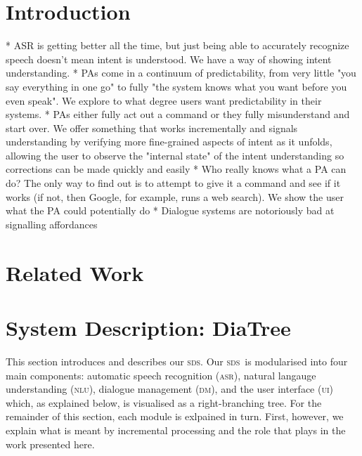 \documentclass[11pt]{article}
\title{}
\author{Casey Kennington \and David Schlangen}
\newcommand{\sds}[0]{\textsc{sds}}
\newcommand{\nlu}[0]{\textsc{nlu}}
\newcommand{\asr}[0]{\textsc{asr}}
\newcommand{\dm}[0]{\textsc{dm}}
\newcommand{\ui}[0]{\textsc{ui}}
\begin{document}

\maketitle

\begin{abstract}

\end{abstract}

\section{Introduction}
\label{section:intro}



* ASR is getting better all the time, but just being able to accurately recognize speech doesn't mean intent is understood. We have a way of showing intent understanding. 
* PAs come in a continuum of predictability, from very little "you say everything in one go" to fully "the system knows what you want before you even speak". We explore to what degree users want predictability in their systems.
* PAs either fully act out a command or they fully misunderstand and start over.  We offer something that works incrementally and signals understanding by verifying more fine-grained aspects of intent as it unfolds, allowing the user to observe the "internal state" of the intent understanding so corrections can be made quickly and easily
* Who really knows what a PA can do? The only way to find out is to attempt to give it a command and see if it works (if not, then Google, for example, runs a web search). We show the user what the PA could potentially do
* Dialogue systems are notoriously bad at signalling affordances


\section{Related Work}
\label{section:related_work}


\section{System Description: DiaTree}
\label{section:system_def}

This section introduces and describes our \sds. Our \sds\ is modularised into four main components: automatic speech recognition (\asr), natural langauge understanding (\nlu), dialogue management (\dm), and the user interface (\ui) which, as explained below, is visualised as a right-branching tree. For the remainder of this section, each module is exlpained in turn. First, however, we explain what is meant by incremental processing and the role that plays in the work presented here. 
\end{document}
